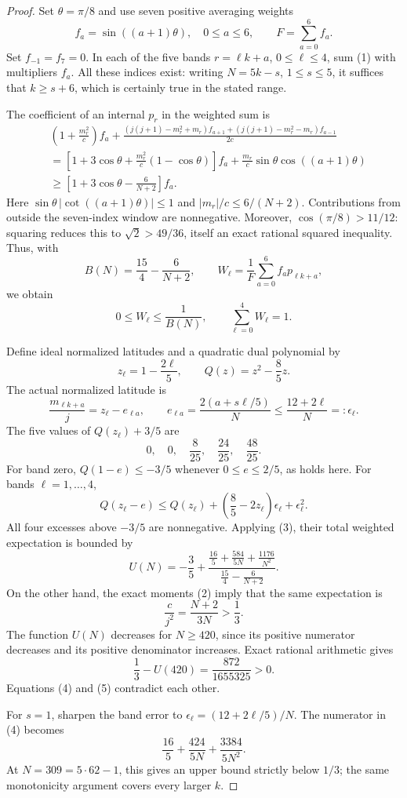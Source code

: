 \documentclass[11pt]{article}
\begin{document}
\begin{proof}
Set $\theta=\pi/8$ and use seven positive averaging weights
\[
 f_a=\sin((a+1)\theta),\quad 0\le a\le6,\qquad F=\sum_{a=0}^6 f_a.
\]
Set $f_{-1}=f_7=0$. In each of the five bands $r=\ell k+a$, $0\le\ell\le4$,
sum (1) with multipliers $f_a$. All these indices exist: writing
$N=5k-s$, $1\le s\le5$, it suffices that $k\ge s+6$, which is certainly true
in the stated range.

The coefficient of an internal $p_r$ in the weighted sum is
\begin{align*}
 &\left(1+\frac{m_r^2}{c}\right)f_a+
 \frac{(j(j+1)-m_r^2+m_r)f_{a+1}
       +(j(j+1)-m_r^2-m_r)f_{a-1}}{2c}\\
 &=\left[1+3\cos\theta+
       \frac{m_r^2}{c}(1-\cos\theta)\right]f_a
       +\frac{m_r}{c}\sin\theta\cos((a+1)\theta)\\
 &\ge\left[1+3\cos\theta-\frac{6}{N+2}\right]f_a.
\end{align*}
Here $\sin\theta\,|\cot((a+1)\theta)|\le1$ and $|m_r|/c\le6/(N+2)$.
Contributions from outside the seven-index window are nonnegative.
Moreover, $\cos(\pi/8)>11/12$: squaring reduces this to
$\sqrt2>49/36$, itself an exact rational squared inequality.
Thus, with
\[
 B(N)=\frac{15}{4}-\frac6{N+2},\qquad
 W_\ell=\frac1F\sum_{a=0}^6f_a p_{\ell k+a},
\]
we obtain
\[
 0\le W_\ell\le\frac1{B(N)},\qquad \sum_{\ell=0}^4W_\ell=1. \tag{3}
\]

Define ideal normalized latitudes and a quadratic dual polynomial by
\[
 z_\ell=1-\frac{2\ell}{5},\qquad Q(z)=z^2-\frac85z.
\]
The actual normalized latitude is
\[
 \frac{m_{\ell k+a}}j=z_\ell-e_{\ell a},\qquad
 e_{\ell a}=\frac{2(a+s\ell/5)}N\le\frac{12+2\ell}{N}=:\epsilon_\ell.
\]
The five values of $Q(z_\ell)+3/5$ are
\[
 0,\quad0,\quad\frac8{25},\quad\frac{24}{25},\quad\frac{48}{25}.
\]
For band zero, $Q(1-e)\le-3/5$ whenever $0\le e\le2/5$, as holds here.
For bands $\ell=1,\ldots,4$,
\[
 Q(z_\ell-e)\le Q(z_\ell)
       +\left(\frac85-2z_\ell\right)\epsilon_\ell+\epsilon_\ell^2.
\]
All four excesses above $-3/5$ are nonnegative. Applying (3), their total
weighted expectation is bounded by
\[
 U(N)=-\frac35+
 \frac{\displaystyle\frac{16}{5}+\frac{584}{5N}+\frac{1176}{N^2}}
      {\displaystyle\frac{15}{4}-\frac6{N+2}}. \tag{4}
\]
On the other hand, the exact moments (2) imply that the same expectation is
\[
 \frac{c}{j^2}=\frac{N+2}{3N}>\frac13. \tag{5}
\]
The function $U(N)$ decreases for $N\ge420$, since its positive numerator
decreases and its positive denominator increases. Exact rational arithmetic
gives
\[
 \frac13-U(420)=\frac{872}{1655325}>0.
\]
Equations (4) and (5) contradict each other.

For $s=1$, sharpen the band error to
$\epsilon_\ell=(12+2\ell/5)/N$. The numerator in (4) becomes
\[
 \frac{16}{5}+\frac{424}{5N}+\frac{3384}{5N^2}.
\]
At $N=309=5\cdot62-1$, this gives an upper bound strictly below $1/3$;
the same monotonicity argument covers every larger $k$.
\end{proof}
\end{document}
